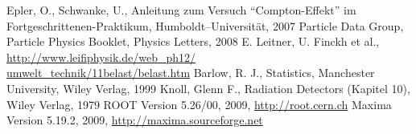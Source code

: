 \renewcommand{\refname}{Literatur und Programme}
\begin{thebibliography}{xxxxxx}
Epler, O., Schwanke, U., Anleitung zum Versuch ``Compton-Effekt'' im
Fortgeschrittenen-Praktikum, Humboldt–Universität, 2007
Particle Data Group, Particle Physics Booklet, Physics Letters, 2008
E. Leitner, U. Finckh et al.,\\
\href{http://www.leifiphysik.de/web_ph12/umwelt_technik/11belast/belast.htm}{
http://www.leifiphysik.de/web\_ph12/\\umwelt\_technik/11belast/belast.htm}
Barlow, R. J., Statistics, Manchester University, Wiley Verlag, 1999
Knoll, Glenn F., Radiation Detectors (Kapitel 10), Wiley Verlag, 1979
ROOT Version 5.26/00, 2009, \href{http://root.cern.ch}{http://root.cern.ch}
Maxima Version 5.19.2, 2009, \href{http://maxima.sourceforge.net}{http://maxima.sourceforge.net}
\end{thebibliography}